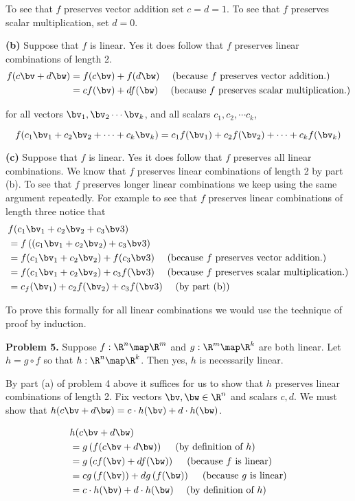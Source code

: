 \documentclass[oneside,12pt]{amsart}
\begin{document}
To see that $f$ preserves vector addition set $c=d=1$. To see that $f$
preserves scalar multiplication, set $d=0$.

\smallskip

\textbf{(b)} Suppose that $f$ is linear. Yes it does follow that $f$ preserves
linear combinations of length 2.
\begin{align*}
f(c\bv + d\bw) &= f(c\bv) + f(d\bw) \quad \text{ (because $f$ preserves vector addition.)} \\
               &= c f(\bv) + d f(\bw) \quad \text{ (because $f$ preserves scalar multiplication.)}
\end{align*}

\smallskip

for all vectors $\bv_1,\bv_2 \cdots \bv_k$, and all scalars
$c_1, c_2, \cdots c_k$,

$$f(c_1 \bv_1 + c_2 \bv_2 + \cdots + c_k \bv_k)
= c_1 f(\bv_1) + c_2 f(\bv_2) + \cdots + c_k f(\bv_k)$$


\textbf{(c)} Suppose that $f$ is linear. Yes it does follow that $f$ preserves
all linear combinations. We know that $f$ preserves linear combinations of
length 2 by part (b). To see that $f$ preserves longer linear combinations
we keep using the same argument repeatedly. For example to see that $f$
preserves linear combinations of length three notice that
\begin{align*}
&f(c_1 \bv_1 + c_2 \bv_2 + c_3 \bv3) \\
&= f\left( (c_1 \bv_1 + c_2 \bv_2 )+ c_3 \bv3 \right) \\
&= f(c_1 \bv_1 + c_2 \bv_2) + f(c_3 \bv3) \quad \text{ (because $f$ preserves vector addition.)} \\
&= f(c_1 \bv_1 + c_2 \bv_2) + c_3f(\bv3) \quad \text{ (because $f$ preserves scalar multiplication.)} \\
&= c_f(\bv_1) + c_2 f(\bv_2) + c_3f(\bv3) \quad \text{ (by part (b))} \\
\end{align*}

To prove this formally for all linear combinations we would use the technique
of proof by induction.

\smallskip

\textbf{Problem 5.} Suppose $f:\R^n\map\R^m$ and $g:\R^m\map\R^k$ are both linear.
Let $h=g\circ f$ so that $h:\R^n\map\R^k$. Then yes, $h$ is necessarily linear.

By part (a) of problem 4 above it suffices for us to show that $h$ preserves
linear combinations of length 2. Fix vectors $\bv, \bw \in \R^n$ and scalars
$c,d$. We must show that $h(c\bv +d \bw) = c \cdot h(\bv) + d \cdot h(\bw)$.

\begin{align*}
&h(c\bv +d \bw) \\
&= g\left( f(c\bv +d \bw) \right)  \quad \text{ (by definition of $h$)} \\
&= g\left( cf(\bv) +df(\bw) \right)  \quad \text{ (because $f$ is linear)} \\
&= c g\left( f(\bv) \right) +d g \left(f(\bw) \right)  \quad \text{ (because $g$ is linear)} \\
& = c \cdot h(\bv) + d \cdot h(\bw) \quad \text{ (by definition of $h$)}
\end{align*}
\end{document}
